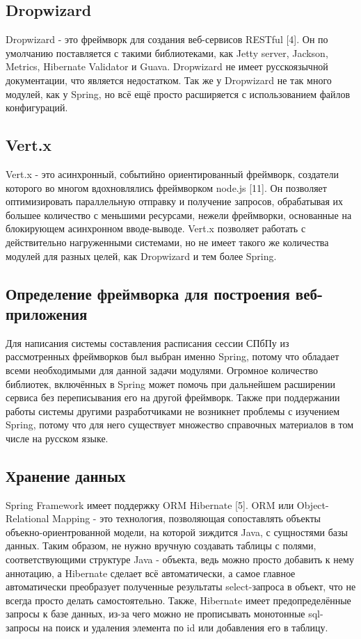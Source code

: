 \subsection{Dropwizard}
Dropwizard - это фреймворк для создания веб-сервисов RESTful [4]. Он по умолчанию поставляется с такими библиотеками, как Jetty server, Jackson, Metrics, Hibernate Validator и Guava. Dropwizard не имеет русскоязычной документации, что является недостатком. Так же у Dropwizard не так много модулей, как у Spring, но всё ещё просто расширяется с использованием файлов конфигураций.

\subsection{Vert.x}
Vert.x - это асинхронный, событийно ориентированный фреймворк, создатели которого во многом вдохновлялись фреймворком node.js [11]. Он позволяет оптимизировать параллельную отправку и получение запросов, обрабатывая их большее количество с меньшими ресурсами, нежели фреймворки, основанные на блокирующем асинхронном вводе-выводе. Vert.x позволяет работать с действительно нагруженными системами, но не имеет такого же количества модулей для разных целей, как Dropwizard и тем более Spring.

\subsection{Определение фреймворка для построения веб-приложения} 
Для написания системы составления расписания сессии СПбПу из рассмотренных фреймворков был выбран именно Spring, потому что обладает всеми необходимыми для данной задачи модулями. Огромное количество библиотек, включённых в Spring может помочь при дальнейшем расширении сервиса без переписывания его на другой фреймворк. Также при поддержании работы системы другими разработчиками не возникнет проблемы с изучением Spring, потому что для него существует множество справочных материалов в том числе на русском языке.

\subsection{Хранение данных}
Spring Framework имеет поддержку ORM Hibernate [5]. ORM или Object-Relational Mapping - это технология, позволяющая сопоставлять объекты объекно-ориентрованной модели, на которой зиждится Java, с сущностями базы данных. Таким образом, не нужно вручную создавать таблицы с полями, соответствующими структуре Java - объекта, ведь можно просто добавить к нему аннотацию, а Hibernate сделает всё автоматически, а самое главное автоматически преобразует полученные результаты select-запроса в объект, что не всегда просто делать самостоятельно. Также, Hibernate имеет предопределённые запросы к базе данных, из-за чего можно не прописывать монотонные sql-запросы на поиск и удаления элемента по id или добавления его в таблицу.


